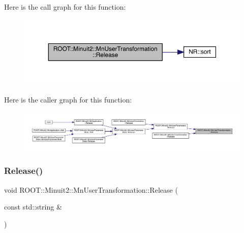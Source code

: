 Here is the call graph for this function\+:
\nopagebreak
\begin{figure}[H]
\begin{center}
\leavevmode
\includegraphics[width=350pt]{d9/d98/classROOT_1_1Minuit2_1_1MnUserTransformation_acc0c7437f21dc53d1d56d62f7a82d352_cgraph}
\end{center}
\end{figure}
Here is the caller graph for this function\+:
\nopagebreak
\begin{figure}[H]
\begin{center}
\leavevmode
\includegraphics[width=350pt]{d9/d98/classROOT_1_1Minuit2_1_1MnUserTransformation_acc0c7437f21dc53d1d56d62f7a82d352_icgraph}
\end{center}
\end{figure}
\mbox{\label{classROOT_1_1Minuit2_1_1MnUserTransformation_ac9272ca2d514e879f59b0bb7dcbf9906}} 
\subsubsection{\texorpdfstring{Release()}{Release()}\hspace{0.1cm}{\footnotesize\ttfamily [4/6]}}
{\footnotesize\ttfamily void R\+O\+O\+T\+::\+Minuit2\+::\+Mn\+User\+Transformation\+::\+Release (\begin{DoxyParamCaption}\item[{const std\+::string \&}]{ }\end{DoxyParamCaption})}

\mbox{\label{classROOT_1_1Minuit2_1_1MnUserTransformation_ac9272ca2d514e879f59b0bb7dcbf9906}} 
